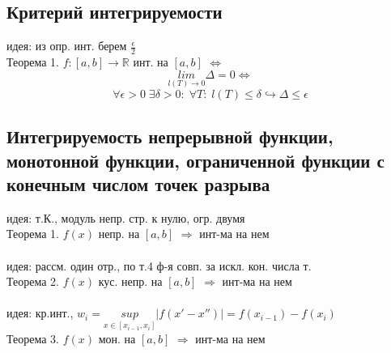\documentclass{article}
\begin{document}
\subsection{Критерий интегрируемости}
идея: из опр. инт. берем $\frac{\epsilon}{2}$ \\
Теорема 1. $f:[a,b]\rightarrow\mathbb R$ инт. на $[a,b]$ $\Leftrightarrow$
\begin{equation*}
    \underset{l(T) \rightarrow 0}{lim} \Delta = 0 \Leftrightarrow
\end{equation*}
\begin{equation*}
    \forall \epsilon > 0 \; \exists \delta > 0: \; \forall T: \; l(T) \leq \delta \hookrightarrow \Delta \leq \epsilon
\end{equation*}
\subsection{Интегрируемость непрерывной функции, монотонной функции, ограниченной функции с конечным числом точек разрыва}
идея: т.К., модуль непр. стр. к нулю, огр. двумя \\
Теорема 1. $f(x)$ непр. на $[a,b]$ $\Rightarrow$ инт-ма на нем \\
\\
идея: рассм. один отр., по т.4 ф-я совп. за искл. кон. числа т. \\
Теорема 2. $f(x)$ кус. непр. на $[a,b]$ $\Rightarrow$ инт-ма на нем \\
\\
идея: кр.инт., $w_i = \underset{x \in [x_{i-1}, x_i]}{sup} |f(x'-x'')| = f(x_{i-1}) - f(x_{i}) $ \\
Теорема 3. $f(x)$ мон. на $[a,b]$ $\Rightarrow$ инт-ма на нем \\
\end{document}
